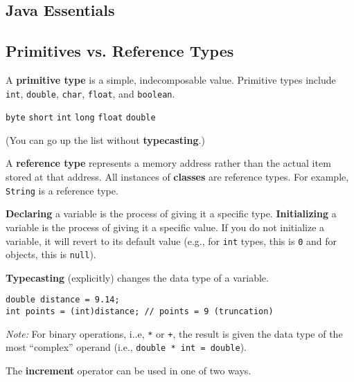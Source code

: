 \documentclass{article}
\newcommand{\nline}{\vspace{\baselineskip}}
\begin{document}
\begin{flushleft}

\section{Java Essentials}

\subsection{Primitives vs. Reference Types}

A \textbf{primitive type} is a simple, indecomposable value. Primitive types include \texttt{int}, \texttt{double}, \texttt{char}, \texttt{float}, and \texttt{boolean}.

\begin{center}
    \texttt{byte} \; \textrightarrow \; \texttt{short} \; \textrightarrow \; \texttt{int} \; \textrightarrow \; \texttt{long} \; \textrightarrow \; \texttt{float} \; \textrightarrow \; \texttt{double}
\end{center}
(You can go up the list without \textbf{typecasting}.)

\nline

A \textbf{reference type} represents a memory address rather than the actual item stored at that address. All instances of \textbf{classes} are reference types. For example, \texttt{String} is a reference type.

\nline

\textbf{Declaring} a variable is the process of giving it a specific type. \textbf{Initializing} a variable is the process of giving it a specific value. If you do not initialize a variable, it will revert to its default value (e.g., for \texttt{int} types, this is \texttt{0} and for objects, this is \texttt{null}).

\nline

\textbf{Typecasting} (explicitly) changes the data type of a variable.

\begin{verbatim}
double distance = 9.14;
int points = (int)distance; // points = 9 (truncation)
\end{verbatim}

\textit{Note:} For binary operations, i..e, \texttt{*} or \texttt{+}, the result is given the data type of the most ``complex'' operand (i.e., \texttt{double * int = double}).

\nline

The \textbf{increment} operator can be used in one of two ways.


\end{flushleft}
\end{document}
